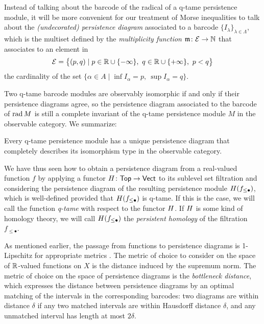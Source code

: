Instead of talking about the barcode of the radical of a q-tame persistence module, it will be more convenient for our treatment of Morse inequalities to talk about the \emph{(undecorated) persistence diagram} associated to a barcode $\{I_{\lambda}\}_{\lambda \in \Lambda}$, which is the multiset defined by the \emph{multiplicity function} $\mathfrak{m} \colon \mathcal{E} \to \mathbb{N}$ that associates to an element in
\[
\mathcal{E} =
\big\{ (p,q) \mid p \in \mathbb{R} \cup \{-\infty\}, \ q \in \mathbb{R} \cup \{+\infty\}, \ p < q \big\}
\]
the cardinality of the set $\{ \alpha \in A \mid \inf I_{\alpha} = p,\ \sup I_{\alpha} = q\}$.

Two q-tame barcode modules are observably isomorphic if and only if their persistence diagrams agree, so the persistence diagram associated to the barcode of $\operatorname{rad} M$ is still a complete invariant of the q-tame persistence module $M$ in the observable category.
We summarize:

\begin{thm} \label{thm:q-tame modules have barcodes}
Every q-tame persistence module has a unique persistence diagram that completely describes its isomorphism type in the observable category.
\end{thm}

We have thus seen how to obtain a persistence diagram from a real-valued function $f$ by applying a functor $H \colon \mathsf{Top} \to \mathsf{Vect}$ to its sublevel set filtration and considering the persistence diagram of the resulting persistence module $H(f_{\leq \bullet})$, which is well-defined provided that $H(f_{\leq \bullet})$ is q-tame. If this is the case, we will call the function \emph{q-tame} with respect to the functor $H$. If $H$ is some kind of homology theory, we will call $H(f_{\leq \bullet})$ the \emph{persistent homology} of the filtration $f_{\leq \bullet}$.

As mentioned earlier, the passage from functions to persistence diagrams is 1-Lipschitz for appropriate metrics \cite{MR3333456}. The metric of choice to consider on the space of $\mathbb{R}$-valued functions on $X$ is the distance induced by the supremum norm. The metric of choice on the space of persistence diagrams is the \emph{bottleneck distance}, which expresses the distance between persistence diagrams by an optimal matching of the intervals in the corresponding barcodes: two diagrams are within distance $\delta$ if any two matched intervals are within Hausdorff distance $\delta$, and any unmatched interval has length at most $2\delta$.

